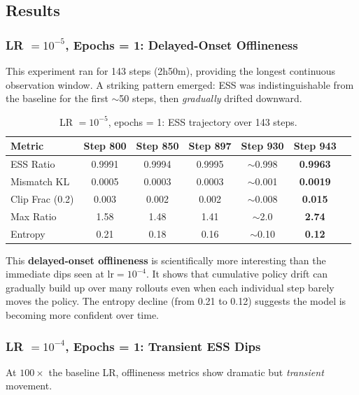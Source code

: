 \documentclass[11pt,a4paper]{article}
\begin{document}
\subsection{Results}

\subsubsection{LR $= 10^{-5}$, Epochs = 1: Delayed-Onset Offlineness}

This experiment ran for 143 steps (2h50m), providing the longest continuous
observation window. A striking pattern emerged: ESS was indistinguishable from
the baseline for the first $\sim$50 steps, then \emph{gradually} drifted
downward.

\begin{table}[H]
\centering
\caption{LR $= 10^{-5}$, epochs = 1: ESS trajectory over 143 steps.}
\label{tab:lr1e5_ep1_trajectory}
\begin{tabular}{@{}lcccccc@{}}
\toprule
\textbf{Metric} & \textbf{Step 800} & \textbf{Step 850} & \textbf{Step 897} & \textbf{Step 930} & \textbf{Step 943} \\
\midrule
ESS Ratio      & 0.9991 & 0.9994 & 0.9995 & $\sim$0.998 & \textbf{0.9963} \\
Mismatch KL    & 0.0005 & 0.0003 & 0.0003 & $\sim$0.001 & \textbf{0.0019} \\
Clip Frac (0.2) & 0.003 & 0.002 & 0.002 & $\sim$0.008 & \textbf{0.015} \\
Max Ratio      & 1.58  & 1.48  & 1.41  & $\sim$2.0  & \textbf{2.74} \\
Entropy        & 0.21  & 0.18  & 0.16  & $\sim$0.10 & \textbf{0.12} \\
\bottomrule
\end{tabular}
\end{table}

This \textbf{delayed-onset offlineness} is scientifically more interesting than
the immediate dips seen at $\mathrm{lr} = 10^{-4}$. It shows that cumulative
policy drift can gradually build up over many rollouts even when each individual
step barely moves the policy. The entropy decline (from 0.21 to 0.12) suggests
the model is becoming more confident over time.

\subsubsection{LR $= 10^{-4}$, Epochs = 1: Transient ESS Dips}

At $100\times$ the baseline LR, offlineness metrics show dramatic but
\emph{transient} movement.
\end{document}
